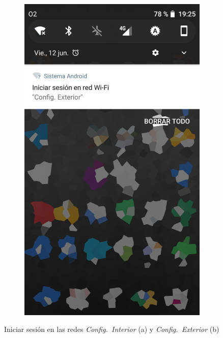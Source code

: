 \begin{figure}
\begin{subfigure}{0.49\columnwidth}
  \includegraphics[width=1\columnwidth,frame]{images/exterior-captive-portal-notification}
  \caption{}
  \label{fig:exterior-captive-portal-notification}
\end{subfigure}
\caption{Iniciar sesión en las redes \textit{Config.~Interior} (a) y \textit{Config.~Exterior} (b)}
\end{figure}


